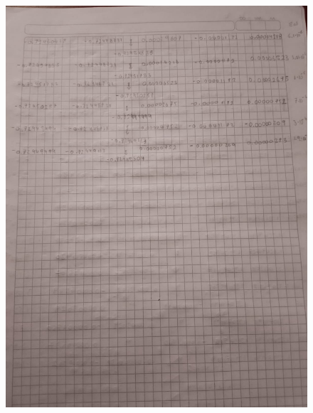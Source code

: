 \documentclass[12pt]{article}
\begin{document}
\begin{figure}[H]
\centering
\includegraphics[width=1\textwidth]{./inFiles/Figures/7.jpeg}
\end{figure}
\end{document}
